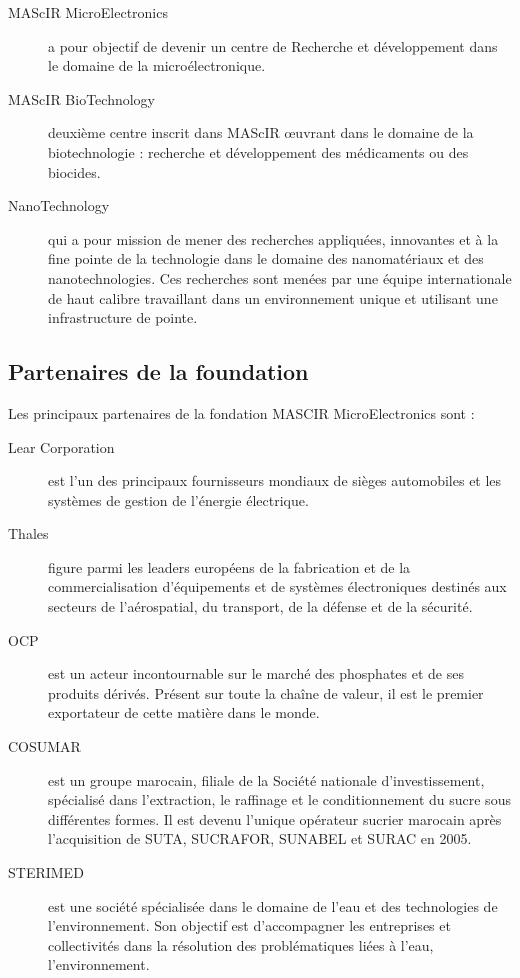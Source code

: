 \documentclass[11pt, a4paper, twoside]{book}
\begin{document}
\begin{description}
\item[MAScIR MicroElectronics] a pour objectif de devenir un centre de Recherche et développement dans le domaine de la microélectronique.
\item[MAScIR BioTechnology] deuxième centre inscrit dans MAScIR œuvrant dans le domaine de la biotechnologie : recherche et développement des médicaments ou des biocides.
\item[NanoTechnology] qui a pour mission de mener des recherches appliquées, innovantes et à la fine pointe de la technologie dans le domaine des nanomatériaux et des nanotechnologies. Ces recherches sont menées par une équipe internationale de haut calibre travaillant dans un environnement unique et utilisant une infrastructure de pointe.
\end{description}

\subsection{Partenaires de la foundation}
Les principaux partenaires de la fondation MASCIR MicroElectronics sont :
\begin{description}
\item[Lear Corporation] est l’un des principaux fournisseurs mondiaux de sièges automobiles et les systèmes de gestion de l’énergie électrique.
\item[Thales] figure parmi les leaders européens de la fabrication et de la commercialisation d'équipements et de systèmes électroniques destinés aux secteurs de l'aérospatial, du transport, de la défense et de la sécurité.
\item[OCP] est un acteur incontournable sur le marché des phosphates et de ses produits dérivés. Présent sur toute la chaîne de valeur, il est le premier exportateur de cette matière dans le monde.
\item[COSUMAR] est un groupe marocain, filiale de la Société nationale d'investissement, spécialisé dans l'extraction, le raffinage et le conditionnement du sucre sous différentes formes. Il est devenu l'unique opérateur sucrier marocain après l'acquisition de SUTA, SUCRAFOR, SUNABEL et SURAC en 2005.
\item[STERIMED] est une société spécialisée dans le domaine de l’eau et des technologies de l’environnement. Son objectif est d’accompagner les entreprises et collectivités dans la résolution des problématiques liées à l’eau, l’environnement.
\end{description}
\end{document}
